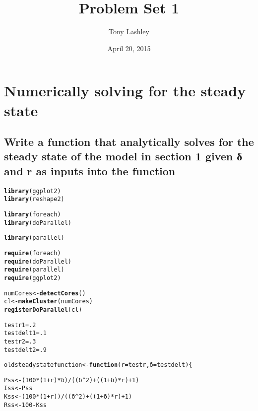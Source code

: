 \documentclass{article}\usepackage[]{graphicx}\usepackage[]{color}
\title{Problem Set 1}
\author{Tony Lashley}
\date{April 20, 2015}
\makeatletter
\newcommand{\hlnum}[1]{\textcolor[rgb]{0.686,0.059,0.569}{#1}}%
\newcommand{\hlopt}[1]{\textcolor[rgb]{0,0,0}{#1}}%
\newcommand{\hlstd}[1]{\textcolor[rgb]{0.345,0.345,0.345}{#1}}%
\newcommand{\hlkwa}[1]{\textcolor[rgb]{0.161,0.373,0.58}{\textbf{#1}}}%
\newcommand{\hlkwb}[1]{\textcolor[rgb]{0.69,0.353,0.396}{#1}}%
\newcommand{\hlkwc}[1]{\textcolor[rgb]{0.333,0.667,0.333}{#1}}%
\newcommand{\hlkwd}[1]{\textcolor[rgb]{0.737,0.353,0.396}{\textbf{#1}}}%
\newenvironment{kframe}{%
 \def\at@end@of@kframe{}%
 \ifinner\ifhmode%
  \def\at@end@of@kframe{\end{minipage}}%
  \begin{minipage}{\columnwidth}%
 \fi\fi%
 \def\FrameCommand##1{\hskip\@totalleftmargin \hskip-\fboxsep
 \colorbox{shadecolor}{##1}\hskip-\fboxsep
     \hskip-\linewidth \hskip-\@totalleftmargin \hskip\columnwidth}%
 \MakeFramed {\advance\hsize-\width
   \@totalleftmargin\z@ \linewidth\hsize
   \@setminipage}}%
 {\par\unskip\endMakeFramed%
 \at@end@of@kframe}
\newenvironment{knitrout}{}{} %
\makeatother
\begin{document}
\section{Numerically solving for the steady state}
\subsection{Write a function that analytically solves for the steady state of the model in section 1 given δ and r as inputs into the function}
\begin{knitrout}
\color{fgcolor}\begin{kframe}
\begin{alltt}
\hlkwd{library}\hlstd{(ggplot2)}
\hlkwd{library}\hlstd{(reshape2)}

\hlkwd{library}\hlstd{(foreach)}
\hlkwd{library}\hlstd{(doParallel)}
\end{alltt}


{\ttfamily\noindent\itshape\color{messagecolor}{\#\# Loading required package: iterators\\\#\# Loading required package: parallel}}\begin{alltt}
\hlkwd{library}\hlstd{(parallel)}

\hlkwd{require}\hlstd{(foreach)}
\hlkwd{require}\hlstd{(doParallel)}
\hlkwd{require}\hlstd{(parallel)}
\hlkwd{require}\hlstd{(ggplot2)}

\hlstd{numCores} \hlkwb{<-} \hlkwd{detectCores}\hlstd{()}
\hlstd{cl} \hlkwb{<-} \hlkwd{makeCluster}\hlstd{(numCores)}
\hlkwd{registerDoParallel}\hlstd{(cl)}

\hlstd{testr1} \hlkwb{=} \hlnum{.2}
\hlstd{testdelt1} \hlkwb{=} \hlnum{.1}
\hlstd{testr2} \hlkwb{=} \hlnum{.3}
\hlstd{testdelt2} \hlkwb{=} \hlnum{.9}

\hlstd{oldsteadystatefunction} \hlkwb{<-} \hlkwa{function}\hlstd{(}\hlkwc{r} \hlstd{= testr,}\hlkwc{δ} \hlstd{= testdelt)\{}

\hlstd{Pss} \hlkwb{<-} \hlstd{(}\hlnum{100}\hlopt{*}\hlstd{(}\hlnum{1}\hlopt{+}\hlstd{r)}\hlopt{*}\hlstd{δ)} \hlopt{/} \hlstd{((δ}\hlopt{^}\hlnum{2}\hlstd{)} \hlopt{+} \hlstd{((}\hlnum{1}\hlopt{+}\hlstd{δ)}\hlopt{*}\hlstd{r)} \hlopt{+} \hlnum{1}\hlstd{)}
\hlstd{Iss} \hlkwb{<-} \hlstd{Pss}
\hlstd{Kss} \hlkwb{<-} \hlstd{(}\hlnum{100}\hlopt{*}\hlstd{(}\hlnum{1}\hlopt{+}\hlstd{r))} \hlopt{/} \hlstd{((δ}\hlopt{^}\hlnum{2}\hlstd{)} \hlopt{+} \hlstd{((}\hlnum{1}\hlopt{+}\hlstd{δ)}\hlopt{*}\hlstd{r)} \hlopt{+} \hlnum{1}\hlstd{)}
\hlstd{Rss} \hlkwb{<-} \hlnum{100} \hlopt{-} \hlstd{Kss}


\end{alltt}
\end{kframe}
\end{knitrout}
\end{document}
